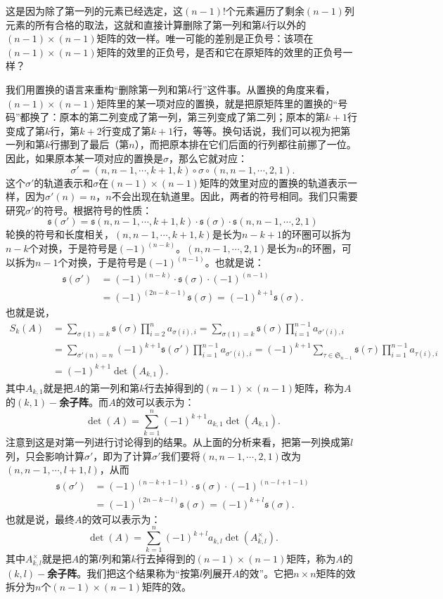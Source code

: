 \documentclass[12pt,UTF8,fontset=none]{ctexbook}
\begin{document}
这是因为除了第一列的元素已经选定，这$(n-1)!$个元素遍历了剩余$(n-1)$列元素的所有合格的取法，这就和直接计算删除了第一列和第$k$行以外的$(n-1)\times (n-1)$矩阵的效一样。唯一可能的差别是正负号：该项在$(n-1)\times (n-1)$矩阵的效里的正负号，是否和它在原矩阵的效里的正负号一样？

我们用置换的语言来重构“删除第一列和第$k$行”这件事。从置换的角度来看，$(n-1)\times (n-1)$矩阵里的某一项对应的置换，就是把原矩阵里的置换的“号码”都换了：原本的第二列变成了第一列，第三列变成了第二列；原本的第$k+1$行变成了第$k$行，第$k+2$行变成了第$k+1$行，等等。换句话说，我们可以视为把第一列和第$k$行挪到了最后（第$n$），而把原本排在它们后面的行列都往前挪了一位。因此，如果原本某一项对应的置换是$\sigma$，那么它就对应：
$$
\sigma' = (n,n-1,\cdots,k+1,k)\circ\sigma \circ(n,n-1,\cdots, 2,1).
$$
这个$\sigma'$的轨道表示和$\sigma$在$(n-1)\times (n-1)$矩阵的效里对应的置换的轨道表示一样，因为$\sigma'(n)=n$，$n$不会出现在轨道里。因此，两者的符号相同。我们只需要研究$\sigma'$的符号。根据符号的性质：
$$
\mathfrak{s} (\sigma') = \mathfrak{s}(n,n-1,\cdots,k+1,k)\cdot \mathfrak{s}(\sigma)\cdot \mathfrak{s}(n,n-1,\cdots, 2,1)
$$
轮换的符号和长度相关，$(n,n-1,\cdots,k+1,k)$是长为$n-k+1$的环圈可以拆为$n-k$个对换，于是符号是$(-1)^{(n-k)}$。$(n,n-1,\cdots,2,1)$是长为$n$的环圈，可以拆为$n-1$个对换，于是符号是$(-1)^{(n-1)}$。也就是说：
\begin{align*}
    \mathfrak{s} (\sigma') &= (-1)^{(n-k)}\cdot \mathfrak{s}(\sigma) \cdot (-1)^{(n-1)} \\
    &= (-1)^{(2n-k-1)}\mathfrak{s}(\sigma) = (-1)^{k+1}\mathfrak{s}(\sigma).
\end{align*}
也就是说，
\begin{align*}
    S_k(A) &= \sum_{\sigma(1)=k} \mathfrak{s}(\sigma) \prod_{i=2}^n a_{\sigma(i),i} = \sum_{\sigma(1)=k} \mathfrak{s}(\sigma) \prod_{i=1}^{n-1} a_{\sigma'(i),i} \\
    &= \sum_{\sigma'(n)=n} (-1)^{k+1}\mathfrak{s}(\sigma') \prod_{i=1}^{n-1} a_{\sigma'(i),i} = (-1)^{k+1}\sum_{\tau\in\mathfrak{S}_{n-1}} \mathfrak{s}(\tau) \prod_{i=1}^{n-1} a_{\tau(i),i} \\
    &= (-1)^{k+1} \det(A_{k,1}).
\end{align*}
其中$A_{k,1}$就是把$A$的第一列和第$k$行去掉得到的$(n-1)\times (n-1)$矩阵，称为$A$的$(k,1)-$\textbf{余子阵}。而$A$的效可以表示为：
$$
\det(A) = \sum_{k=1}^n (-1)^{k+1} a_{k,1} \det(A_{k,1}).
$$
注意到这是对第一列进行讨论得到的结果。从上面的分析来看，把第一列换成第$l$列，只会影响计算$\sigma'$，即为了计算$\sigma'$我们要将$(n,n-1,\cdots, 2,1)$改为$(n,n-1,\cdots,l+1,l)$，从而
\begin{align*}
    \mathfrak{s} (\sigma') &= (-1)^{(n-k+1-1)}\cdot \mathfrak{s}(\sigma) \cdot (-1)^{(n-l+1-1)} \\
    &= (-1)^{(2n-k-l)}\mathfrak{s}(\sigma) = (-1)^{k+l}\mathfrak{s}(\sigma).
\end{align*}
也就是说，最终$A$的效可以表示为：
$$
\det(A) = \sum_{k=1}^n (-1)^{k+l} a_{k,l} \det(A_{k,l}^{\times}).
$$
其中$A_{k,l}^{\times}$就是把$A$的第$l$列和第$k$行去掉得到的$(n-1)\times (n-1)$矩阵，称为$A$的$(k,l)-$\textbf{余子阵}。我们把这个结果称为“按第$l$列展开$A$的效”。它把$n\times n$矩阵的效拆分为$n$个$(n-1)\times (n-1)$矩阵的效。
\end{document}
